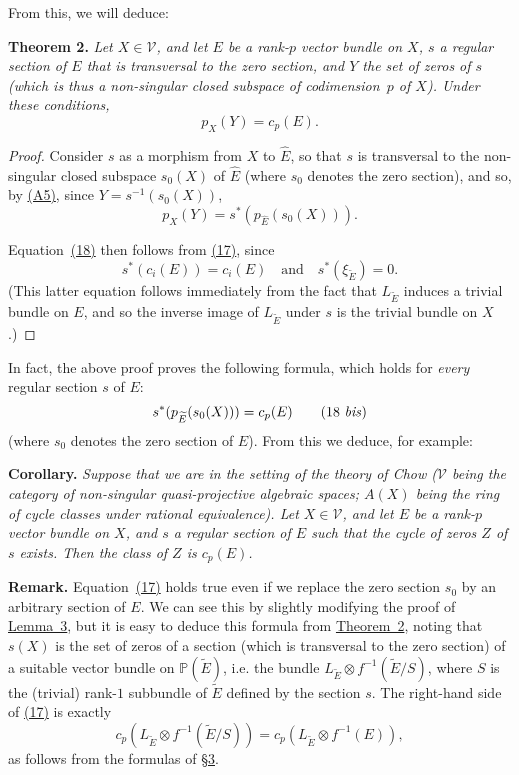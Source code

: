 \documentclass{article}
\newenvironment{itenv}[1]
  {\phantomsection\par\medskip\noindent\textbf{#1.}\itshape}
  {\par\medskip}
\newenvironment{rmenv}[1]
  {\phantomsection\par\medskip\noindent\textbf{#1.}\rmfamily}
  {\par\medskip}
\renewcommand{\cal}[1]{{\mathcal{#1}}}
\newcommand{\oldpage}[1]{\marginpar{\footnotesize$\Big\vert$ \textit{p.~#1}}}
\begin{document}
From this, we will deduce:

\begin{itenv}{Theorem 2}
\label{theorem2}
  Let $X\in\cal{V}$, and let $E$ be a rank-$p$ vector bundle on $X$, $s$ a regular section of $E$ that is transversal to the zero section, and $Y$ the set of zeros of $s$ (which is thus a non-singular closed subspace of codimension~$p$ of $X$).
  Under these conditions,
  \[
  \label{equation18}
    p_X(Y) = c_p(E).
  \tag{18}
  \] 
\end{itenv}

\begin{proof}
  Consider $s$ as a morphism from $X$ to $\widehat{E}$, so that $s$ is transversal to the non-singular closed subspace $s_0(X)$ of $\widehat{E}$ (where $s_0$ denotes the zero section), and so, by \hyperref[axiomA5]{(A5)}, since $Y=s^{-1}(s_0(X))$,
  \[
    p_X(Y) = s^*(p_{\widehat{E}}(s_0(X))).
  \]

  Equation~\hyperref[equation18]{(18)} then follows from \hyperref[equation17]{(17)}, since
  \[
    s^*(c_i(E)) = c_i(E)
    \quad\text{and}\quad
    s^*(\xi_{\widetilde{E}}) = 0.
  \]
  (This latter equation follows immediately from the fact that $L_{\widetilde{E}}$ induces a trivial bundle on $E$, and so the inverse image of $L_{\widetilde{E}}$ under $s$ is the trivial bundle on $X$.)
\end{proof}

In fact, the above proof proves the following formula, which holds for \emph{every} regular section $s$ of $E$:
\[
\label{equation18bis}
  s^*(p_{\widetilde{E}}(s_0(X))) = c_p(E)
\tag{18 \emph{bis}}
\]
(where $s_0$ denotes the zero section of $E$).
From this we deduce, for example:

\begin{itenv}{Corollary}
  Suppose that we are in the setting of the theory of Chow ($\cal{V}$ being the category of non-singular quasi-projective algebraic spaces; $A(X)$ being the ring of cycle classes under rational equivalence).
  Let $X\in\cal{V}$, and let $E$ be a rank-$p$ vector bundle on $X$, and $s$ a regular section of $E$ such that the cycle of zeros $Z$ of $s$ exists.
  Then the class of $Z$ is $c_p(E)$.
\end{itenv}

\begin{rmenv}{Remark}
  Equation~\hyperref[equation17]{(17)} holds true even if we replace the zero section $s_0$ by an arbitrary section of $E$.
  We can see this by slightly modifying the proof of \hyperref[lemma3]{Lemma~3}, but it is easy to deduce this formula from
\oldpage{154}
  \hyperref[theorem2]{Theorem~2}, noting that $s(X)$ is the set of zeros of a section (which is transversal to the zero section) of a suitable vector bundle on $\mathbb{P}(\widetilde{E})$, i.e. the bundle $L_{\widetilde{E}}\otimes f^{-1}(\widetilde{E}/S)$, where $S$ is the (trivial) rank-$1$ subbundle of $\widetilde{E}$ defined by the section $s$.
  The right-hand side of \hyperref[equation17]{(17)} is exactly
  \[
    c_p(L_{\widetilde{E}}\otimes f^{-1}(\widetilde{E}/S)) = c_p(L_{\widetilde{E}}\otimes f^{-1}(E)),
  \]
  as follows from the formulas of \hyperref[section3]{\S3}.
\end{rmenv}
\end{document}
